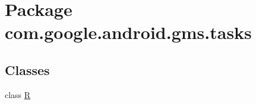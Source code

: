\hypertarget{namespacecom_1_1google_1_1android_1_1gms_1_1tasks}{}\section{Package com.\+google.\+android.\+gms.\+tasks}
\label{namespacecom_1_1google_1_1android_1_1gms_1_1tasks}
\subsection*{Classes}
\begin{DoxyCompactItemize}
\item 
class \mbox{\hyperlink{classcom_1_1google_1_1android_1_1gms_1_1tasks_1_1R}{R}}
\end{DoxyCompactItemize}
